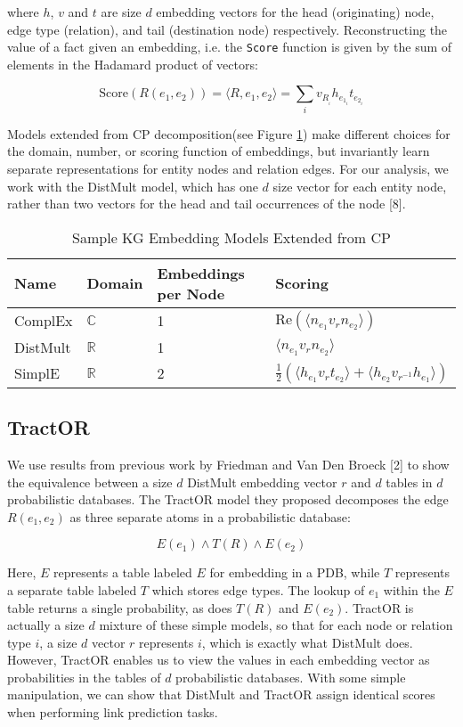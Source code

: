 \documentclass{article}
\begin{document}
where \(h\), \(v\) and \(t\) are size \(d\) embedding vectors for the head
(originating) node, edge type (relation), and tail (destination node)
respectively. Reconstructing the value of a fact given an embedding, i.e. the
\texttt{Score} function is given by the sum of elements in the Hadamard product
of vectors:

\[ \textrm{Score}(R(e_1, e_2)) = \langle R, e_1, e_2 \rangle = \sum_{i}
v_{R_{{}_i}} h_{e_{1_i}} t_{e_{2_i}} \]

Models extended from CP decomposition(see Figure \ref{kg-models}) make different
choices for the domain, number, or scoring function of embeddings, but
invariantly learn separate representations for entity nodes and relation edges.
For our analysis, we work with the DistMult model, which has one \(d\) size
vector for each entity node, rather than two vectors for the head and tail
occurrences of the node [8].

\begin{table}
  \caption{Sample KG Embedding Models Extended from CP}
  \label{kg-models}
  \centering
  \begin{tabular}{llll}
    \toprule
    Name        & Domain         & Embeddings per Node   & Scoring \\
    \midrule
    ComplEx     & \(\mathbb{C}\) & 1 & 
        \(\textrm{Re}(\langle n_{e_1} v_r n_{e_2}\rangle)\) \\
    DistMult    & \(\mathbb{R}\) & 1 & 
        \(\langle n_{e_1} v_r n_{e_2}\rangle\) \\
    SimplE      & \(\mathbb{R}\) & 2 & 
        \(\frac{1}{2}(\langle h_{e_1} v_r t_{e_2}\rangle 
        + \langle h_{e_2} v_{r^{-1}} h_{e_1}\rangle)\) \\
    \bottomrule \end{tabular}
\end{table}

\subsection{TractOR}

We use results from previous work by Friedman and Van Den Broeck [2] to show the
equivalence between a size \(d\) DistMult embedding vector \(r\) and \(d\)
tables in \(d\) probabilistic databases. The TractOR model they proposed
decomposes the edge \(R(e_1, e_2)\) as three separate atoms in a probabilistic
database:

\[ E(e_1) \land T(R) \land E(e_2) \]

Here, \(E\) represents a table labeled \(E\) for embedding in a PDB, while \(T\)
represents a separate table labeled \(T\) which stores edge types. The lookup of
\(e_1\) within the \(E\) table returns a single probability, as does \(T(R)\)
and \(E(e_2)\). TractOR is actually a size \(d\) mixture of these simple models,
so that for each node or relation type \(i\), a size \(d\) vector \(r\)
represents \(i\), which is exactly what DistMult does. However, TractOR enables
us to view the values in each embedding vector as probabilities in the tables of
\(d\) probabilistic databases. With some simple manipulation, we can show that
DistMult and TractOR assign identical scores when performing link prediction
tasks.
\end{document}
